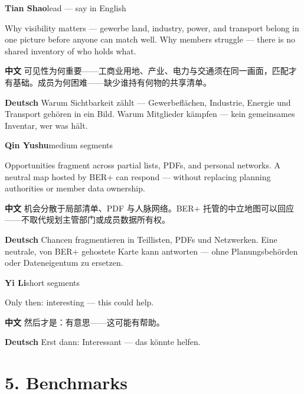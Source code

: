 \documentclass[11pt,a4paper]{ctexart}
\newenvironment{speakerblock}[2]{%
  \par\medskip
  {\color{berblue}\textbf{#1}}\hfill{\small\textcolor{bergrey}{#2}}\par
  \vspace{0.25em}
}{\par\medskip}
\begin{document}
\begin{speakerblock}{Tian Shao}{lead — say in English}
\begin{englishbox}
Why visibility matters — gewerbe land, industry, power, and transport belong in one picture before anyone can match well. Why members struggle — there is no shared inventory of who holds what.
\end{englishbox}

\textbf{中文} 可见性为何重要——工商业用地、产业、电力与交通须在同一画面，匹配才有基础。成员为何困难——缺少谁持有何物的共享清单。

\textbf{Deutsch} Warum Sichtbarkeit zählt — Gewerbeflächen, Industrie, Energie und Transport gehören in ein Bild. Warum Mitglieder kämpfen — kein gemeinsames Inventar, wer was hält.
\end{speakerblock}


\begin{speakerblock}{Qin Yushu}{medium segments}
\begin{englishbox}
Opportunities fragment across partial lists, PDFs, and personal networks. A neutral map hosted by BER+ can respond — without replacing planning authorities or member data ownership.
\end{englishbox}

\textbf{中文} 机会分散于局部清单、PDF 与人脉网络。BER+ 托管的中立地图可以回应——不取代规划主管部门或成员数据所有权。

\textbf{Deutsch} Chancen fragmentieren in Teillisten, PDFs und Netzwerken. Eine neutrale, von BER+ gehostete Karte kann antworten — ohne Planungsbehörden oder Dateneigentum zu ersetzen.
\end{speakerblock}


\begin{speakerblock}{Yi Li}{short segments}
\begin{englishbox}
Only then: interesting — this could help.
\end{englishbox}

\textbf{中文} 然后才是：有意思——这可能有帮助。

\textbf{Deutsch} Erst dann: Interessant — das könnte helfen.
\end{speakerblock}



\section{5. Benchmarks}
\end{document}
